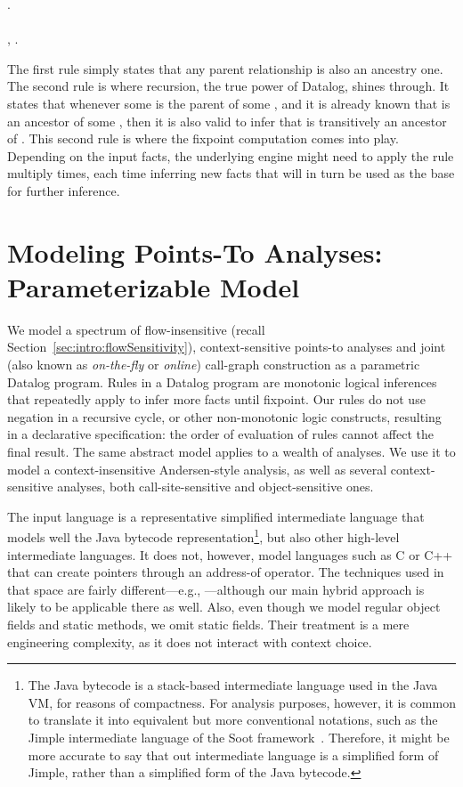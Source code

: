 \begin{datalog}
 \dlIf{} . \\
\\
 \dlIf{} , .
\end{datalog}

The first rule simply states that any parent relationship is also an ancestry one. The second rule is where recursion, the true power of Datalog, shines through. It states that whenever some  is the parent of some , and it is already known that  is an ancestor of some , then it is also valid to infer that  is transitively an ancestor of . This second rule is where the fixpoint computation comes into play. Depending on the input facts, the underlying engine might need to apply the rule multiply times, each time inferring new facts that will in turn be used as the base for further inference.


\section{Modeling Points-To Analyses: Parameterizable Model}
\label{sec:intro:model}

We model a spectrum of flow-insensitive (recall Section~\ref{sec:intro:flowSensitivity}), context-sensitive points-to analyses and joint (also known as \emph{on-the-fly} or \emph{online}) call-graph construction as a parametric Datalog program. Rules in a Datalog program are monotonic logical inferences that repeatedly apply to infer more facts until fixpoint. Our rules do not use negation in a recursive cycle, or other non-monotonic logic constructs, resulting in a declarative specification: the order of evaluation of rules cannot affect the final result. The same abstract model applies to a wealth of analyses. We use it to model a context-insensitive Andersen-style \cite{thesis:Andersen} analysis, as well as several context-sensitive analyses, both call-site-sensitive and object-sensitive ones.

The input language is a representative simplified intermediate language that models well the Java bytecode representation\footnote{The Java bytecode is a stack-based intermediate language used in the Java VM, for reasons of compactness. For analysis purposes, however, it is common to translate it into equivalent but more conventional notations, such as the Jimple intermediate language of the Soot framework~\cite{cascon:1999:Vall,cc:2000:Vall}. Therefore, it might be more accurate to say that out intermediate language is a simplified form of Jimple, rather than a simplified form of the Java bytecode.}, but also other high-level intermediate languages. It does not, however, model languages such as C or C++ that can create pointers through an address-of operator. The techniques used in that space are fairly different---e.g., \cite{pldi:2007:Hardekopf,popl:2009:Hardekopf}---although our main hybrid approach is likely to be applicable there as well. Also, even though we model regular object fields and static methods, we omit static fields. Their treatment is a mere engineering complexity, as it does not interact with context choice.

